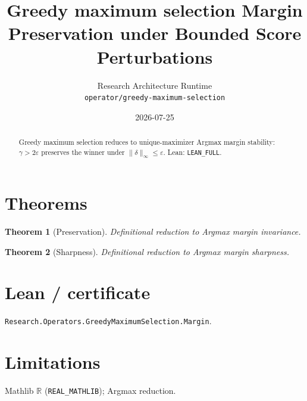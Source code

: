 \documentclass[11pt]{article}
\title{Greedy maximum selection Margin Preservation under Bounded Score Perturbations}
\author{Research Architecture Runtime \\ \texttt{operator/greedy-maximum-selection}}
\date{2026-07-25}
\newtheorem{theorem}{Theorem}
\begin{document}
\maketitle
\begin{abstract}
Greedy maximum selection reduces to unique-maximizer Argmax margin stability: $\gamma>2\varepsilon$
preserves the winner under $\|\delta\|_\infty\le\varepsilon$. Lean: \texttt{LEAN\_FULL}.
\end{abstract}
\section{Theorems}
\begin{theorem}[Preservation]
Definitional reduction to Argmax margin invariance.
\end{theorem}
\begin{theorem}[Sharpness]
Definitional reduction to Argmax margin sharpness.
\end{theorem}
\section{Lean / certificate}
\texttt{Research.Operators.GreedyMaximumSelection.Margin}.
\section{Limitations}
Mathlib $\mathbb{R}$ (\texttt{REAL\_MATHLIB}); Argmax reduction.
\end{document}
